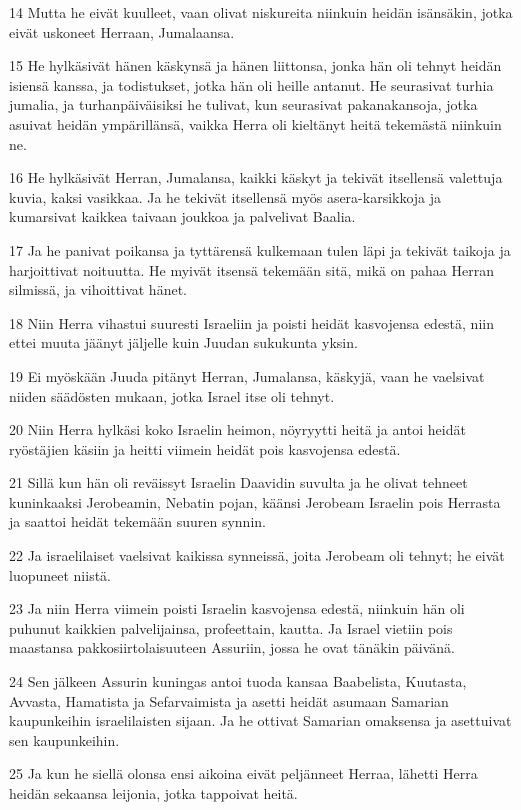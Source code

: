 \par 14 Mutta he eivät kuulleet, vaan olivat niskureita niinkuin heidän isänsäkin, jotka eivät uskoneet Herraan, Jumalaansa.
\par 15 He hylkäsivät hänen käskynsä ja hänen liittonsa, jonka hän oli tehnyt heidän isiensä kanssa, ja todistukset, jotka hän oli heille antanut. He seurasivat turhia jumalia, ja turhanpäiväisiksi he tulivat, kun seurasivat pakanakansoja, jotka asuivat heidän ympärillänsä, vaikka Herra oli kieltänyt heitä tekemästä niinkuin ne.
\par 16 He hylkäsivät Herran, Jumalansa, kaikki käskyt ja tekivät itsellensä valettuja kuvia, kaksi vasikkaa. Ja he tekivät itsellensä myös asera-karsikkoja ja kumarsivat kaikkea taivaan joukkoa ja palvelivat Baalia.
\par 17 Ja he panivat poikansa ja tyttärensä kulkemaan tulen läpi ja tekivät taikoja ja harjoittivat noituutta. He myivät itsensä tekemään sitä, mikä on pahaa Herran silmissä, ja vihoittivat hänet.
\par 18 Niin Herra vihastui suuresti Israeliin ja poisti heidät kasvojensa edestä, niin ettei muuta jäänyt jäljelle kuin Juudan sukukunta yksin.
\par 19 Ei myöskään Juuda pitänyt Herran, Jumalansa, käskyjä, vaan he vaelsivat niiden säädösten mukaan, jotka Israel itse oli tehnyt.
\par 20 Niin Herra hylkäsi koko Israelin heimon, nöyryytti heitä ja antoi heidät ryöstäjien käsiin ja heitti viimein heidät pois kasvojensa edestä.
\par 21 Sillä kun hän oli reväissyt Israelin Daavidin suvulta ja he olivat tehneet kuninkaaksi Jerobeamin, Nebatin pojan, käänsi Jerobeam Israelin pois Herrasta ja saattoi heidät tekemään suuren synnin.
\par 22 Ja israelilaiset vaelsivat kaikissa synneissä, joita Jerobeam oli tehnyt; he eivät luopuneet niistä.
\par 23 Ja niin Herra viimein poisti Israelin kasvojensa edestä, niinkuin hän oli puhunut kaikkien palvelijainsa, profeettain, kautta. Ja Israel vietiin pois maastansa pakkosiirtolaisuuteen Assuriin, jossa he ovat tänäkin päivänä.
\par 24 Sen jälkeen Assurin kuningas antoi tuoda kansaa Baabelista, Kuutasta, Avvasta, Hamatista ja Sefarvaimista ja asetti heidät asumaan Samarian kaupunkeihin israelilaisten sijaan. Ja he ottivat Samarian omaksensa ja asettuivat sen kaupunkeihin.
\par 25 Ja kun he siellä olonsa ensi aikoina eivät peljänneet Herraa, lähetti Herra heidän sekaansa leijonia, jotka tappoivat heitä.
